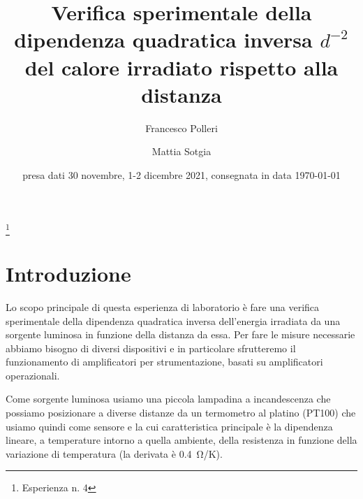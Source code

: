 \documentclass[
    rmp,
    reprint, 
    superscriptaddress, 
    altaffilletter, 
    amsmath, 
    amssymb,
    a4paper]{revtex4-2}
\begin{document}
\title{Verifica sperimentale della dipendenza quadratica inversa $d^{-2}$ del calore irradiato rispetto alla distanza 
}
\thanks{Esperienza n. 4
}

\author{Francesco Polleri}
\author{Mattia Sotgia}


\date{presa dati
    30 novembre, 1-2 dicembre 2021, consegnata in data 
    \today
}

\begin{abstract}
    
\end{abstract}
\maketitle
\thispagestyle{fancy}


\section*{Introduzione}
Lo scopo principale di questa esperienza di laboratorio è fare una verifica sperimentale della dipendenza quadratica inversa dell'energia irradiata da una sorgente luminosa in funzione della distanza da essa.
Per fare le misure necessarie abbiamo bisogno di diversi dispositivi e in particolare sfrutteremo il funzionamento di amplificatori per strumentazione, basati su amplificatori operazionali.

Come sorgente luminosa usiamo una piccola lampadina a incandescenza che possiamo posizionare a diverse distanze da un termometro al platino (PT100) che usiamo quindi come sensore e la cui caratteristica principale è la dipendenza lineare, a temperature intorno a quella ambiente, della resistenza in funzione della variazione di temperatura (la derivata è \SI{0.4}{\ohm/\kelvin}). 

\end{document}
